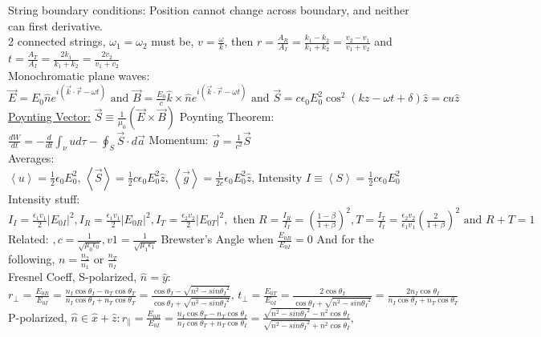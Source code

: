 \documentclass{report}
\begin{document}
String boundary conditions: Position cannot change across boundary, and neither can first derivative. \\
2 connected strings, $\omega_1 = \omega_2$ must be, $ v = \frac{\omega}{k}$, then $r = \frac{A_R}{A_I} = \frac{k_1-k_2}{k_1+k_2} = \frac{v_2-v_1}{v_1+v_2}$ and $ t = \frac{A_T}{A_I} = \frac{2k_1}{k_1+k_2} = \frac{2v_2}{v_1+v_2}$ \\
Monochromatic plane waves: $\vec{E} = E_0 \hat{n} e^{i(\vec{k}\cdot\vec{r}-\omega t)} \text{ and } \vec{B} = \frac{E_0}{c} \hat{k} \times \hat{n} e^{i(\vec{k}\cdot\vec{r}-\omega t)} \text{ and } \vec{S} = c\epsilon_0 E_0^2 \cos^2 (kz-\omega t + \delta) \hat{z} = cu\hat{z}$ \\
\underline{Poynting Vector:} $ \vec{S} \equiv \frac{1}{\mu_0}(\vec{E} \times \vec{B})$  Poynting Theorem: $ \frac{dW}{dt} = -\frac{d}{dt}\int_{\nu}ud\tau - \oint_S \vec{S}\cdot d\vec{a}$  Momentum: $\vec{g} = \frac{1}{c^2}\vec{S}$\\
Averages: $\left \langle u\right \rangle = \frac{1}{2}\epsilon_0 E_0^2 \text{, } \left \langle \vec{S}\right \rangle = \frac{1}{2}c\epsilon_0 E_0^2  \hat{z}  \text{, }  \left \langle \vec{g}\right \rangle = \frac{1}{2c}\epsilon_0 E_0^2  \hat{z}  \text{, Intensity } I\equiv \left \langle S\right \rangle = \frac{1}{2}c\epsilon_0 E_0^2   $ \\
Intensity stuff: $I_I = \frac{\epsilon_1 v_1}{2}|E_{0I}|^2, I_R = \frac{\epsilon_1 v_1}{2}|E_{0R}|^2, I_T = \frac{\epsilon_2 v_2}{2}|E_{0T}|^2, \text{ then } R = \frac{I_R}{I_I} = (\frac{1-\beta}{1+\beta})^2, T = \frac{I_T}{I_I} = \frac{\epsilon_2v_2}{\epsilon_1v_1}(\frac{2}{1+\beta})^2 \text{ and } R+T = 1 $ \\
Related: $, c =\frac{1}{\sqrt{\mu_0 \epsilon_0}}, v1 = \frac{1}{\sqrt{\mu_1 \epsilon_1}}$ Brewster's Angle when $\frac{E_{0R}}{E_{0I}} = 0$ And for the following, $n = \frac{n_2}{n_1} \text{ or } \frac{n_T}{n_I} $ \\
Fresnel Coeff, S-polarized, $\hat{n}=\hat{y}$: $ r_\perp =\frac{E_{0R}}{E_{0I}} = \frac{n_I\cos{\theta_I}-n_T\cos{\theta_T}}{n_I\cos{\theta_I}+n_T\cos{\theta_T}} = \frac{\cos{\theta_I}-\sqrt{n^2-sin{\theta_I}^2}}{\cos{\theta_I}+\sqrt{n^2-sin{\theta_I}^2}} \text{, } t_\perp = \frac{E_{0T}}{E_{0I}} = \frac{2\cos{\theta_I}}{\cos{\theta_I}+\sqrt{n^2-sin{\theta_I}^2}}= \frac{2n_I\cos{\theta_I}}{n_I\cos{\theta_I}+n_T\cos{\theta_T}}$ \\
P-polarized, $\hat{n} \in \hat{x}+\hat{z}: r_\parallel =\frac{E_{0R}}{E_{0I}} = \frac{n_I\cos{\theta_T}-n_T\cos{\theta_I}}{n_I\cos{\theta_T}+n_T\cos{\theta_I}} =  \frac{\sqrt{n^2-sin{\theta_I}^2}-n^2\cos{\theta_I}}{\sqrt{n^2-sin{\theta_I}^2}+n^2\cos{\theta_I}} \text{, }$
\end{document}
